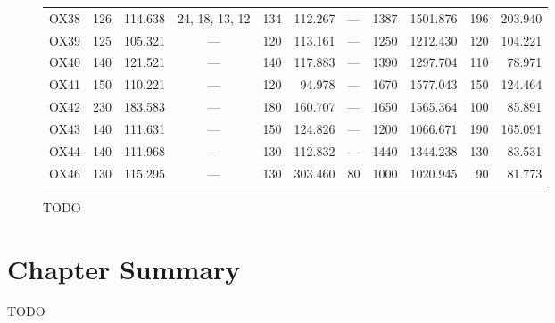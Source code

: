 \begin{landscape}
\begin{figure}[p]
\begin{center}
\begin{tabular}{c|rrc|rrc|rr|rr}
OX38 & 126 & 114.638 & 24, 18, 13, 12 & 134 & 112.267 &                            --- & 1387 & 1501.876 & 196 & 203.940 \\
OX39 & 125 & 105.321 &            --- & 120 & 113.161 &                            --- & 1250 & 1212.430 & 120 & 104.221 \\
OX40 & 140 & 121.521 &            --- & 140 & 117.883 &                            --- & 1390 & 1297.704 & 110 &  78.971 \\
OX41 & 150 & 110.221 &            --- & 120 &  94.978 &                            --- & 1670 & 1577.043 & 150 & 124.464 \\
OX42 & 230 & 183.583 &            --- & 180 & 160.707 &                            --- & 1650 & 1565.364 & 100 &  85.891 \\
OX43 & 140 & 111.631 &            --- & 150 & 124.826 &                            --- & 1200 & 1066.671 & 190 & 165.091 \\
OX44 & 140 & 111.968 &            --- & 130 & 112.832 &                            --- & 1440 & 1344.238 & 130 &  83.531 \\
OX46 & 130 & 115.295 &            --- & 130 & 303.460 &                             80 & 1000 & 1020.945 &  90 &  81.773
\end{tabular}
\end{center}
\caption{TODO}
\label{fig:validation-volcalc-table}
\end{figure}
\end{landscape}





\section{Chapter Summary}

TODO
